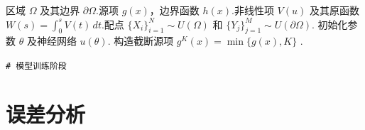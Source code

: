 \par\noindent
\begin{minipage}{\textwidth}
\renewcommand*\footnoterule{}
\renewcommand{\thempfootnote}{\fnsymbol{mpfootnote}}
\begin{algorithm}[H]
\caption{DRM求解半线性偏微分方程}
\label{alg:DRM_semilinear}
\begin{algorithmic}[1]
\Require 区域 $\Omega$ 及其边界 $\partial \Omega$.源项 $g(x)$，边界函数 $h(x)$.非线性项 $V(u)$ 及其原函数 $W(s) = \int_0^s V(t) \, dt$.配点 $\{X_i\}_{i=1}^N \sim U(\Omega)$ 和 $\{Y_j\}_{j=1}^M \sim U(\partial \Omega)$.
\State 初始化参数 $\theta$ 及神经网络 $u(\theta)$.
\State 构造截断源项 $g^K(x) = \min\{g(x), K\}$ .

\State \textcolor{white!30!black}{\texttt{\# 模型训练阶段}}
\EndFor
{}
\end{algorithmic}
\end{algorithm}
\end{minipage}

\section{误差分析}
